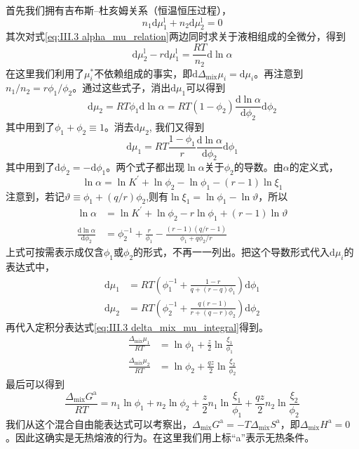 \documentclass[main.tex]{subfiles}
\begin{document}
首先我们拥有吉布斯--杜亥姆关系（恒温恒压过程），
\[n_1\mathrm{d}\mu_1^\text{l}+n_2\mathrm{d}\mu_2^\text{l}=0\]
其次对式\eqref{eq:III.3 alpha_mu_relation}两边同时求关于液相组成的全微分，得到
\[\mathrm{d}\mu_2^\text{l}-r\mathrm{d}\mu_1^\text{l}=\frac{RT}{n_2}\mathrm{d}\ln\alpha\]
在这里我们利用了$\mu_i^*$不依赖组成的事实，即$\mathrm{d}\Delta_\text{mix}\mu_i=\mathrm{d}\mu_i$。再注意到$n_1/n_2=r\phi_1/\phi_2$。通过这些式子，消出$\mathrm{d}\mu_1$可以得到
\[\mathrm{d}\mu_2=RT\phi_1\mathrm{d}\ln\alpha=RT\left(1-\phi_2\right)\frac{\mathrm{d}\ln\alpha}{\mathrm{d}\phi_2}\mathrm{d}\phi_2\]
其中用到了$\phi_1+\phi_2\equiv 1$。消去$\mathrm{d}\mu_2$, 我们又得到
\[\mathrm{d}\mu_1=RT\frac{1-\phi_1}{r}\frac{\mathrm{d}\ln\alpha}{\mathrm{d}\phi_2}\mathrm{d}\phi_1\]
其中用到了$\mathrm{d}\phi_2=-\mathrm{d}\phi_1$。两个式子都出现$\ln\alpha$关于$\phi_2$的导数。由$\alpha$的定义式，
\[\ln\alpha=\ln K^\prime+\ln\phi_2-\ln\phi_1-\left(r-1\right)\ln\xi_1\]
注意到，若记$\vartheta\equiv\phi_1+\left(q/r\right)\phi_2$,则有$\ln\xi_1=\ln\phi_1-\ln \vartheta$，所以
\begin{align*}
  \ln\alpha                                    & =\ln K^\prime+\ln\phi_2-r\ln\phi_1+\left(r-1\right)\ln\vartheta                           \\
  \frac{\mathrm{d}\ln\alpha}{\mathrm{d}\phi_2} & =\phi_2^{-1}+\frac{r}{\phi_1}-\frac{\left(r-1\right)\left(q/r-1\right)}{\phi_1+q\phi_2/r}
\end{align*}
上式可按需表示成仅含$\phi_1$或$\phi_2$的形式，不再一一列出。把这个导数形式代入$\mathrm{d}\mu_i$的表达式中，
\begin{align*}\mathrm{d}\mu_1 & =RT\left(\phi_1^{-1}+\frac{1-r}{q+\left(r-q\right)\phi_1}\right)\mathrm{d}\phi_1               \\
              \mathrm{d}\mu_2 & =RT\left(\phi_2^{-1}+\frac{q\left(r-1\right)}{r+\left(q-r\right)\phi_2}\right)\mathrm{d}\phi_2
\end{align*}
再代入定积分表达式\eqref{eq:III.3 delta_mix_mu_integral}得到。
\begin{align*}
  \frac{\Delta_\text{mix}\mu_1}{RT} & =\ln\phi_1+\frac{z}{2}\ln\frac{\xi_1}{\phi_1}  \\
  \frac{\Delta_\text{mix}\mu_2}{RT} & =\ln\phi_2+\frac{qz}{2}\ln\frac{\xi_2}{\phi_2}
\end{align*}
最后可以得到
\begin{equation}\label{eq:III.3_athermal_polymer_solution_mixing_gibbs_free_energy}
  \frac{\Delta_\text{mix} G^\text{a}}{RT}=n_1\ln\phi_1+n_2\ln\phi_2+\frac{z}{2}n_1\ln\frac{\xi_1}{\phi_1}+\frac{qz}{2}n_2\ln\frac{\xi_2}{\phi_2}
\end{equation}
我们从这个混合自由能表达式可以考察出，$\Delta_\text{mix}G^\text{a}=-T\Delta_\text{mix}S^\text{a}$，即$\Delta_\text{mix}H^\text{a}=0$。因此这确实是无热熔液的行为。在这里我们用上标“a”表示无热条件。
\end{document}
